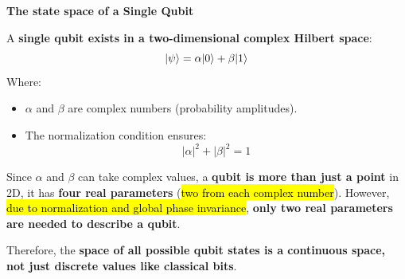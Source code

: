 \highspace
\begin{flushleft}
    \textcolor{Green3}{ \textbf{The state space of a Single Qubit}}
\end{flushleft}
A \textbf{single qubit exists in a two-dimensional complex Hilbert space}:
\begin{equation*}
    | \psi \rangle = \alpha| 0 \rangle + \beta| 1 \rangle
\end{equation*}
Where:
\begin{itemize}
    \item $\alpha$ and $\beta$ are complex numbers (probability amplitudes).
    \item The normalization condition ensures:
    \begin{equation*}
        \left|\alpha\right|^{2} + \left|\beta\right|^{2} = 1
    \end{equation*}
\end{itemize}
Since $\alpha$ and $\beta$ can take complex values, a \textbf{qubit is more than just a point} in 2D, it has \textbf{four real parameters} (\hl{two from each complex number}). However, \hl{due to normalization and global phase invariance}, \textbf{only two real parameters are needed to describe a qubit}.

\highspace
Therefore, the \textbf{space of all possible qubit states is a continuous space, not just discrete values like classical bits}.

\newpage

